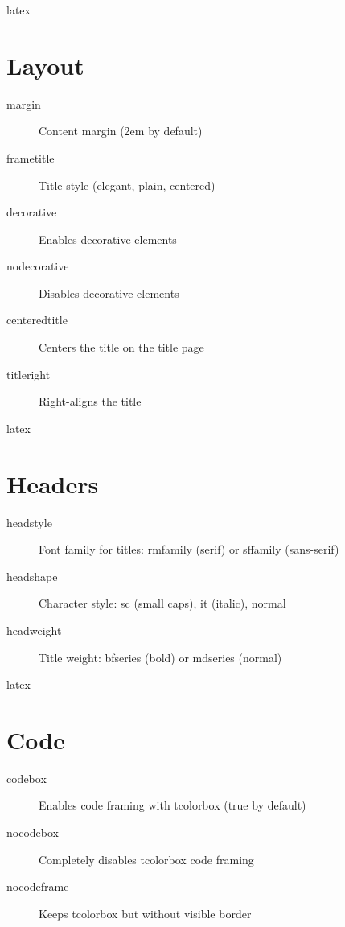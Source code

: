 \documentclass[english]{neoschool}
\begin{document}
\begin{code}{latex}
\end{code}

\section{Layout}
\begin{description}
\item[margin] Content margin (\textcolor{titleColor}{2em} by default)
\item[frametitle] Title style (\textcolor{titleColor}{elegant}, \textcolor{titleColor}{plain}, \textcolor{titleColor}{centered})
\item[decorative] Enables decorative elements
\item[nodecorative] Disables decorative elements
\item[centeredtitle] Centers the title on the title page
\item[titleright] Right-aligns the title
\end{description}

\begin{code}{latex}
\end{code}

\section{Headers}
\begin{description}
\item[headstyle] Font family for titles: \textcolor{titleColor}{rmfamily} (serif) or \textcolor{titleColor}{sffamily} (sans-serif)
\item[headshape] Character style: \textcolor{titleColor}{sc} (small caps), \textcolor{titleColor}{it} (italic), \textcolor{titleColor}{normal}
\item[headweight] Title weight: \textcolor{titleColor}{bfseries} (bold) or \textcolor{titleColor}{mdseries} (normal)
\end{description}

\begin{code}{latex}
\end{code}

\section{Code}
\begin{description}
\item[codebox] Enables code framing with \textcolor{titleColor}{tcolorbox} (\textcolor{titleColor}{true} by default)
\item[nocodebox] Completely disables \textcolor{titleColor}{tcolorbox} code framing
\item[nocodeframe] Keeps \textcolor{titleColor}{tcolorbox} but without visible border
\end{description}
\end{document}
